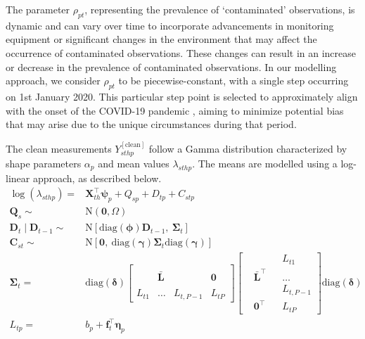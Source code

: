 \documentclass[
  12,
]{article}
\begin{document}
The parameter \(\rho_{pt}\), representing the prevalence of
`contaminated' observations, is dynamic and can vary over time to
incorporate advancements in monitoring equipment or significant changes
in the environment that may affect the occurrence of contaminated
observations. These changes can result in an increase or decrease in the
prevalence of contaminated observations. In our modelling approach, we
consider \(\rho_{pt}\) to be piecewise-constant, with a single step
occurring on 1st January 2020. This particular step point is selected to
approximately align with the onset of the COVID-19 pandemic
\autocite{whotimeline}, aiming to minimize potential bias that may arise
due to the unique circumstances during that period.

The clean measurements \(Y_{sthp}^{[\mbox{clean}]}\) follow a Gamma
distribution characterized by shape parameters \(\alpha_p\) and mean
values \(\lambda_{sthp}\). The means are modelled using a log-linear
approach, as described below. \begin{equation}\label{eqnPollutionhour2}
\begin{aligned}
\log{(\lambda_{sthp})}  = & \symbf{X}_{th}^{\top}\symbf{\psi}_{p} +Q_{sp}+ D_{tp} + C_{stp}\\
\symbf{Q}_{s} \sim & \mbox{N}\left(\symbf{0}, \Omega \right)\\
\symbf{D}_{t}  \mid \symbf{D}_{t-1}   \sim & \mbox{N}\left[\mbox{diag}(\symbf{\phi})  \symbf{D}_{t-1} ,\ \symbf{\Sigma}_t \right]\\
\symbf{C}_{st} \sim & \mbox{N}\left[\symbf{0},\ \mbox{diag}(\symbf{\gamma}) \symbf{\Sigma}_t \mbox{diag}(\symbf{\gamma}) \right] \\
\symbf{\Sigma}_t  = &  \mbox{diag}(\symbf{\delta}) \left[
\begin{array}{cccc}
&  &  &  \\
& \symbf{\bar{L}}  &   &  {\symbf{0}}  \\ 
&  &  &  \\
L_{t1} & \dots & L_{t,P-1}  &  L_{tP}
\end{array}\right] \left[
\begin{array}{cccc} 
&  &  &  L_{t1} \\
& \symbf{\bar{L}}^{\top}  &   &  \dots  \\ 
&  &  & L_{t,P-1} \\
& {\symbf{0}}^{\top} &   &  L_{tP}
\end{array}\right] \mbox{diag}(\symbf{\delta}) \\
L_{tp}  = &  b_p + \symbf{f}_t ^{\top}\symbf{\eta}_p
\end{aligned}
\end{equation}
\end{document}
